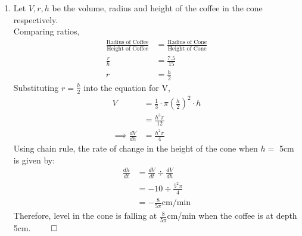 \documentclass[12pt, a4paper]{article}
\begin{document}
\begin{enumerate}[Q\arabic*.]
\begin{enumerate}[(\alph*)]
      \item Let $V, r, h$ be the volume, radius and height of the coffee in the cone respectively. \\
        Comparing ratios,
        \begin{align*}
          \frac{\text{Radius of Coffee}}{\text{Height of Coffee}} &= \frac{\text{Radius of Cone}}{\text{Height of Cone}} \\ 
          \frac{r}{h} &= \frac{7.5}{15} \\
          r &= \frac{h}{2}
        \end{align*}
        Substituting $r=\frac{h}{2}$ into the equation for V,
        \begin{align*}
          V &= \frac{1}{3} \cdot \pi(\frac{h}{2})^2 \cdot h \\
            &= \frac{h^3\pi}{12}\\
          \implies \frac{dV}{dh} &= \frac{h^2\pi}{4}
        \end{align*}
        Using chain rule, the rate of change in the height of the cone when $h =$ 5cm is given by:
        \begin{align*}
          \frac{dh}{dt} &= \frac{dV}{dt} \div \frac{dV}{dh} \\
                        &= -10 \div \frac{5^2\pi}{4} \\
                        &= -\frac{8}{5\pi}\text{cm/min}
        \end{align*}
        Therefore, level in the cone is falling at $\displaystyle \frac{8}{5\pi}$cm/min when the coffee is at depth 5cm. $\qed$
    \end{enumerate}


\end{enumerate}
\end{document}
